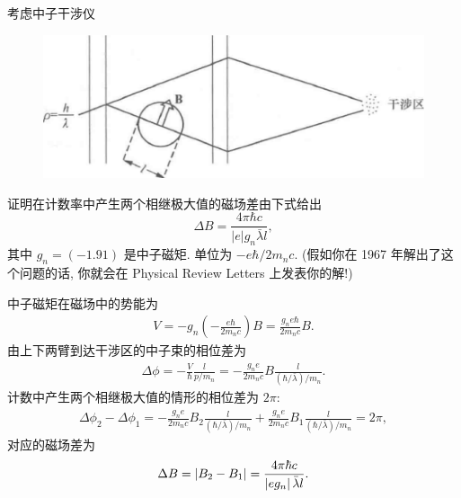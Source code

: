 \documentclass{assignment}
\begin{document}
\begin{prob}[课本习题 2.40]
    考虑中子干涉仪
    \begin{figure}[H]
        \centering
        \includegraphics[width=.5\columnwidth]{4-9.png}
    \end{figure}
    证明在计数率中产生两个相继极大值的磁场差由下式给出
    \[
        \Delta B=\frac{4\pi\hbar c}{|e|g_n\bar{\lambda}l},
    \]
    其中 $g_n=(-1.91)$ 是中子磁矩. 单位为 $-e\hbar/2m_nc$. (假如你在 1967 年解出了这个问题的话, 你就会在 Physical Review Letters 上发表你的解!)
\end{prob}
\begin{pf}
    中子磁矩在磁场中的势能为
    \begin{align}
        V=-g_n\left(-\frac{e\hbar}{2m_nc}\right)B=\frac{g_ne\hbar}{2m_nc}B.
    \end{align}
    由上下两臂到达干涉区的中子束的相位差为
    \begin{align}
        \Delta\phi=-\frac{V}{\hbar}\frac{l}{p/m_n}=-\frac{g_ne}{2m_nc}B\frac{l}{(\hbar/\bar{\lambda})/m_n}.
    \end{align}
    计数中产生两个相继极大值的情形的相位差为 $2\pi$:
    \begin{align}
        \Delta\phi_2-\Delta\phi_1=-\frac{g_ne}{2m_nc}B_2\frac{l}{(\hbar/\bar{\lambda})/m_n}+\frac{g_ne}{2m_nc}B_1\frac{l}{(\hbar/\bar{\lambda})/m_n}=2\pi,
    \end{align}
    对应的磁场差为
    \begin{align}
        \Delta B=\left\lvert B_2-B_1\right\rvert=\frac{4\pi\hbar c}{\left\lvert eg_n\right\rvert\bar{\lambda}l}.
    \end{align}
\end{pf}
\end{document}
